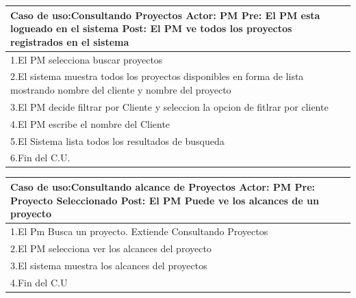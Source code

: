 
\begin{longtable}{|p{}|p{}|}
    \hline
    \multicolumn{2}{|p{16cm}|}{
        \textbf{Caso de uso:}Consultando Proyectos\newline
        \textbf{Actor:} PM\newline
        \textbf{Pre: }El PM esta logueado en el sistema\newline
        \textbf{Post:} El PM ve todos los proyectos registrados en el sistema
    }\\
    \hline
    1.El PM selecciona buscar proyectos& \\
    \hline
    2.El sistema muestra todos los proyectos disponibles en forma de lista mostrando nombre del cliente y nombre del proyecto &\\
    \hline
    3.El PM decide filtrar por Cliente y seleccion la opcion de fitlrar por cliente& \\
    \hline
    4.El PM escribe el nombre del Cliente& \\
    \hline
    5.El Sistema lista todos los resultados de busqueda&\\
    \hline
    6.Fin del C.U.&\\
    \hline
\end{longtable}

\begin{longtable}{|p{}|p{}|}
    \hline
    \multicolumn{2}{|p{16cm}|}{
        \textbf{Caso de uso:}Consultando alcance de Proyectos\newline
        \textbf{Actor:} PM\newline
        \textbf{Pre: }Proyecto Seleccionado\newline
        \textbf{Post:} El PM Puede ve los alcances de un proyecto
    }\\
    \hline
    1.El Pm Busca un proyecto. Extiende Consultando Proyectos& \\
    \hline
    2.El PM selecciona ver los alcances del proyecto&  \\
    \hline
    3.El sistema muestra los alcances del proyectos& \\
    \hline
    4.Fin del C.U&\\
    \hline
\end{longtable}


